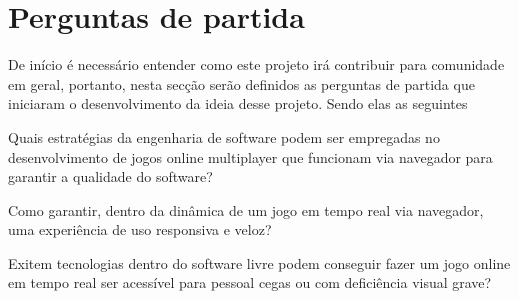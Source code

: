\chapter{Perguntas de partida}

\label{chap:Perguntas de partida}

De início é necessário entender como este projeto irá contribuir para comunidade em geral, portanto, nesta secção serão definidos as perguntas de partida que iniciaram o desenvolvimento da ideia desse projeto. Sendo elas as seguintes

\begin{questao}
  \item Quais estratégias da engenharia de software podem ser empregadas no desenvolvimento de jogos online multiplayer que funcionam via navegador para garantir a qualidade do software?
  \item Como garantir, dentro da dinâmica de um jogo em tempo real via navegador, uma experiência de uso responsiva e veloz?
  \item Exitem tecnologias dentro do software livre podem conseguir fazer um jogo online em tempo real ser acessível para pessoal cegas ou com deficiência visual grave?
\end{questao}
